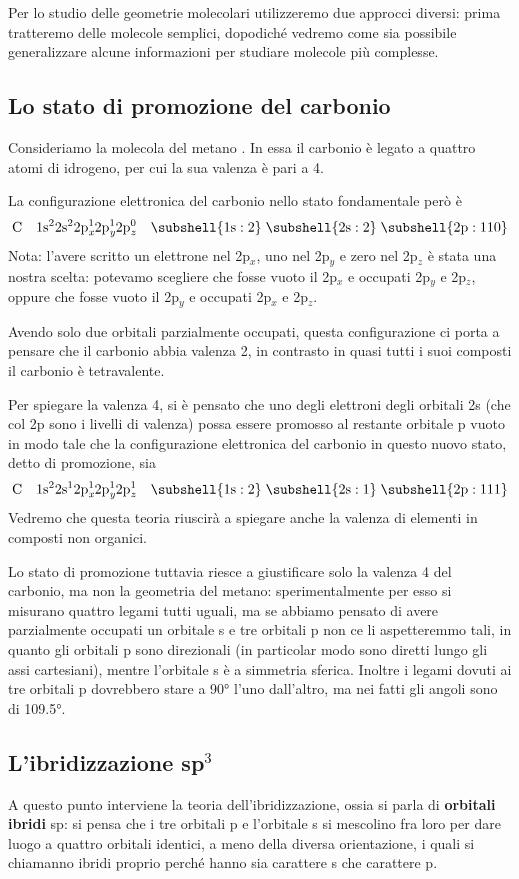 Per lo studio delle geometrie molecolari utilizzeremo due approcci diversi: prima tratteremo delle molecole semplici, dopodiché vedremo come sia possibile generalizzare alcune informazioni per studiare molecole più complesse.
\subsection{Lo stato di promozione del carbonio}
Consideriamo la molecola del metano . In essa il carbonio è legato a quattro atomi di idrogeno, per cui la sua valenza è pari a 4.

La configurazione elettronica del carbonio nello stato fondamentale però è
$$\rm C \quad 1s^22s^22p_{\textit{x}}^12p_{\textit{y}}^12p_{\textit{z}}^0 \quad \subshell{1s:2} \; \subshell{2s:2} \; \subshell{2p:110}$$
Nota: l'avere scritto  un elettrone nel 2p$_x$, uno nel 2p$_y$ e zero nel 2p$_z$ è stata una nostra scelta: potevamo scegliere che fosse vuoto il 2p$_x$ e occupati 2p$_y$ e 2p$_z$, oppure che fosse vuoto il 2p$_y$ e occupati 2p$_x$ e 2p$_z$.

Avendo solo due orbitali parzialmente occupati, questa configurazione ci porta a pensare che il carbonio abbia valenza 2, in contrasto in quasi tutti i suoi composti il carbonio è tetravalente.

Per spiegare la valenza 4, si è pensato che uno degli elettroni degli orbitali 2s (che col 2p sono i livelli di valenza) possa essere promosso al restante orbitale p vuoto in modo tale che la configurazione elettronica del carbonio in questo nuovo stato, detto di promozione, sia
$$\rm C \quad 1s^22s^12p_{\textit{x}}^12p_{\textit{y}}^12p_{\textit{z}}^1 \quad \subshell{1s:2} \; \subshell{2s:1} \; \subshell{2p:111}$$
Vedremo che questa teoria riuscirà a spiegare anche la valenza di elementi in composti non organici.

Lo stato di promozione tuttavia riesce a giustificare solo la valenza 4 del carbonio, ma non la geometria del metano: sperimentalmente per esso si misurano quattro legami tutti uguali, ma se abbiamo pensato di avere parzialmente occupati un orbitale s e tre orbitali p non ce li aspetteremmo tali, in quanto gli orbitali p sono direzionali (in particolar modo sono diretti lungo gli assi cartesiani), mentre l'orbitale s è a simmetria sferica. Inoltre i legami dovuti ai tre orbitali p dovrebbero stare a 90° l'uno dall'altro, ma nei fatti gli angoli sono di 109.5°.
\subsection{L'ibridizzazione sp$^3$}
A questo punto interviene la teoria dell'ibridizzazione, ossia si parla di \textbf{orbitali ibridi} sp: si pensa che i tre orbitali p e l'orbitale s si mescolino fra loro per dare luogo a quattro orbitali identici, a meno della diversa orientazione, i quali si chiamanno ibridi proprio perché hanno sia carattere s che carattere p.

